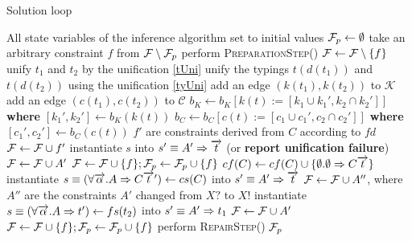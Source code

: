 \begin{algorithm}
    \small
    \caption{Solution loop}
    \label{main_loop}
    \begin{algorithmic}
        \Require All state variables of the inference algorithm set to initial values
        \State $\mathcal F_p \gets \emptyset$ 
            \State take an arbitrary constraint $f$ from $\mathcal F \setminus \mathcal F_p$
            \State perform \textsc{PreparationStep()}
            \State $\mathcal F \gets \mathcal F \setminus \{f\}$ 
                \State unify $t_1$ and $t_2$ by the unification \ref{tUni}
                \State unify the typings $t (d (t_1))$ and $t (d (t_2))$ using the unification \ref{tyUni}
                \State add an edge $(k(t_1), k(t_2))$ to $\mathcal{K}$
                \State add an edge $(c(t_1), c(t_2))$ to $\mathcal{C}$
                \State $b_K \gets b_K[ k(t) := [k_1 \cup k_1', k_2 \cap k_2'] ]$ \textbf{where} $[k_1', k_2'] \gets b_K(k(t))$
                \State $b_C \gets b_C[ c(t) := [c_1 \cup c_1', c_2 \cap c_2'] ]$ \textbf{where} $[c_1', c_2'] \gets b_C(c(t))$
                    \State $f'$ are constraints derived from $C$ according to $fd$
                    \State $\mathcal F \gets \mathcal F \cup f'$
                    \State instantiate $s$ into $s' \equiv A' \Rightarrow \overrightarrow{t}$ (or \textbf{report unification failure})
                    \State $\mathcal F \gets \mathcal F \cup A'$
                \Else
                    \State $\mathcal F \gets \mathcal F \cup \{f\}; \mathcal F_p \gets \mathcal F_p \cup \{f\}$ 
                \EndIf
                \State $cf(C) \gets cf(C) \cup \{\emptyset . \emptyset \Rightarrow C \overrightarrow{t}\} $
                \State instantiate $s \equiv (\forall \overrightarrow{\alpha} . A \Rightarrow C \overrightarrow{t}') \gets cs(C)$ into $s' \equiv A' \Rightarrow \overrightarrow{t}$
                \State $\mathcal F \gets \mathcal F \cup A''$, where $A''$ are the constraints $A'$ changed from $X?$ to $X!$
                    \State instantiate $s \equiv (\forall \overrightarrow{\alpha} . A \Rightarrow t') \gets fs(t_2)$ into $s' \equiv A' \Rightarrow t_1$
                    \State $\mathcal F \gets \mathcal F \cup A'$
                \Else
                    \State $ \mathcal F \gets \mathcal F \cup \{f\}; \mathcal F_p \gets \mathcal F_p \cup \{f\}$ 
                \EndIf
            \EndIf
            \State perform \textsc{RepairStep()}
        \EndWhile
        \State \Return $\mathcal F_p$
    \end{algorithmic}
\end{algorithm}

